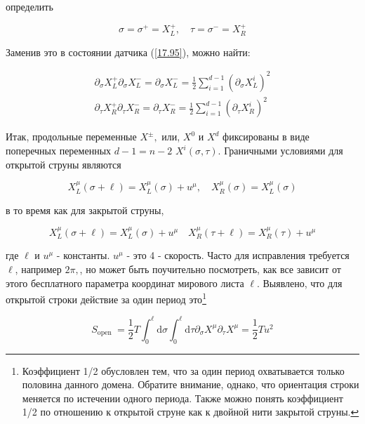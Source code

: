 \documentclass[main.tex]{subfiles}
\begin{document}
определить

\begin{equation}\label{17.101}
\sigma=\sigma^{+}=X_{L}^{+}, \quad \tau=\sigma^{-}=X_{R}^{+}
\end{equation}

Заменив это в состоянии датчика (\ref{17.95}), можно найти:

\begin{equation}\label{17.103}
\begin{array}{l}
{\partial_{\sigma} X_{L}^{+} \partial_{\sigma} X_{L}^{-}=\partial_{\sigma} X_{L}^{-}=\frac{1}{2} \sum_{i=1}^{d-1}\left(\partial_{\sigma} X_{L}^{i}\right)^{2}} \\
{\partial_{\tau} X_{R}^{+} \partial_{\tau} X_{R}^{-}=\partial_{\tau} X_{R}^{-}=\frac{1}{2} \sum_{i=1}^{d-1}\left(\partial_{\tau} X_{R}^{i}\right)^{2}}
\end{array}
\end{equation}

Итак, продольные переменные $X^{\pm},$ или, $X^{0}$ и $X^{d}$ фиксированы в виде поперечных переменных $d-1=n-2$ $X^{i}(\sigma, \tau)$.
Граничными условиями для открытой струны являются

\begin{equation}\label{17.104}
X_{L}^{\mu}(\sigma+\ell)=X_{L}^{\mu}(\sigma)+u^{\mu}, \quad X_{R}^{\mu}(\sigma)=X_{L}^{\mu}(\sigma)
\end{equation}

в то время как для закрытой струны,

\begin{equation}\label{17.105}
X_{L}^{\mu}(\sigma+\ell)=X_{L}^{\mu}(\sigma)+u^{\mu} \quad X_{R}^{\mu}(\tau+\ell)=X_{R}^{\mu}(\tau)+u^{\mu}
\end{equation}

где $\ell$ и $u^{\mu}$ - константы. $u^{\mu}$ - это 4 - скорость. Часто для исправления требуется $\ell$, например $2 \pi,$, но может быть поучительно посмотреть, как все зависит от этого бесплатного параметра координат мирового листа $\ell$. Выявлено, что для открытой строки действие за один период
это\footnote{Коэффициент 1/2 обусловлен тем, что за один период охватывается только половина данного домена. Обратите внимание, однако, что ориентация строки меняется по истечении одного периода. Также можно понять коэффициент 1/2 по отношению к открытой струне как к двойной нити закрытой струны.}

\begin{equation}\label{17.106}
S_{\text {open }}=\frac{1}{2} T \int_{0}^{\ell} \mathrm{d} \sigma \int_{0}^{\ell} \mathrm{d} \tau \partial_{\sigma} X^{\mu} \partial_{\tau} X^{\mu}=\frac{1}{2} T u^{2}
\end{equation}
\end{document}
